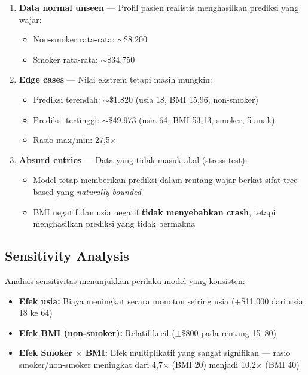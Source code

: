 \documentclass[12pt,a4paper]{article}
\begin{document}
\begin{enumerate}
    \item \textbf{Data normal unseen} — Profil pasien realistis menghasilkan prediksi yang wajar:
    \begin{itemize}
        \item Non-smoker rata-rata: ${\sim}$\$8.200
        \item Smoker rata-rata: ${\sim}$\$34.750
    \end{itemize}

    \item \textbf{Edge cases} — Nilai ekstrem tetapi masih mungkin:
    \begin{itemize}
        \item Prediksi terendah: ${\sim}$\$1.820 (usia 18, BMI 15,96, non-smoker)
        \item Prediksi tertinggi: ${\sim}$\$49.973 (usia 64, BMI 53,13, smoker, 5 anak)
        \item Rasio max/min: 27,5$\times$
    \end{itemize}

    \item \textbf{Absurd entries} — Data yang tidak masuk akal (stress test):
    \begin{itemize}
        \item Model tetap memberikan prediksi dalam rentang wajar berkat sifat tree-based yang \textit{naturally bounded}
        \item BMI negatif dan usia negatif \textbf{tidak menyebabkan crash}, tetapi menghasilkan prediksi yang tidak bermakna
    \end{itemize}
\end{enumerate}

\subsection{Sensitivity Analysis}
Analisis sensitivitas menunjukkan perilaku model yang konsisten:
\begin{itemize}
    \item \textbf{Efek usia:} Biaya meningkat secara monoton seiring usia ($+$\$11.000 dari usia 18 ke 64)
    \item \textbf{Efek BMI (non-smoker):} Relatif kecil ($\pm$\$800 pada rentang 15–80)
    \item \textbf{Efek Smoker $\times$ BMI:} Efek multiplikatif yang sangat signifikan — rasio smoker/non-smoker meningkat dari 4,7$\times$ (BMI 20) menjadi 10,2$\times$ (BMI 40)
\end{itemize}
\end{document}
